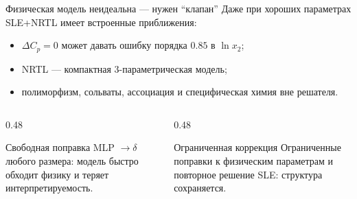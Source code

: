 \documentclass[aspectratio=169,10pt]{beamer}
\newcommand{\tightitems}{\setlength{\itemsep}{0.25em}}
\begin{document}
\begin{frame}{Физическая модель неидеальна — нужен ``клапан''}
  \small
  Даже при хороших параметрах SLE+NRTL имеет встроенные приближения:
  \begin{itemize}\tightitems
    \item $\Delta C_p=0$ может давать ошибку порядка $0.85$ в $\ln x_2$;
    \item NRTL — компактная 3-параметрическая модель;
    \item полиморфизм, сольваты, ассоциация и специфическая химия вне решателя.
  \end{itemize}
  \vspace{0.25em}
  \begin{columns}[T,onlytextwidth]
    \begin{column}{0.48\textwidth}
      \begin{block}{Свободная поправка}
        \scriptsize
        MLP $\to \delta$ любого размера: модель быстро обходит физику и теряет интерпретируемость.
      \end{block}
    \end{column}
    \begin{column}{0.48\textwidth}
      \begin{block}{Ограниченная коррекция}
        \scriptsize
        Ограниченные поправки к физическим параметрам и повторное решение SLE: структура сохраняется.
      \end{block}
    \end{column}
  \end{columns}
\end{frame}
\end{document}
